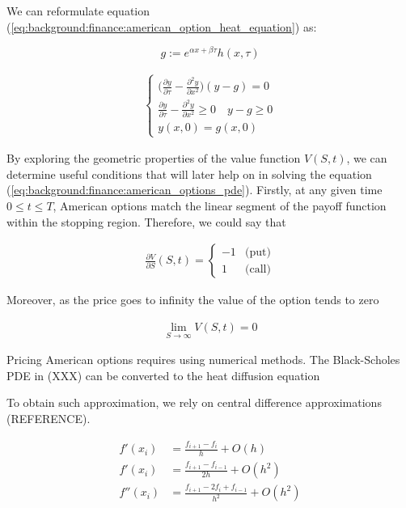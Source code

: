 We can reformulate equation (\ref*{eq:background:finance:american_option_heat_equation})
as:

\begin{equation}
  g := e^{\alpha x + \beta \tau}h(x, \tau)
\end{equation}

\begin{align}
  \begin{cases}
    \big(\frac{\partial y}{\partial \tau} - \frac{\partial^2 y}{\partial x^2}\big)(y  - g) =0 \\
    \frac{\partial y}{\partial \tau} - \frac{\partial^2 y}{\partial x^2} \ge 0 \quad y - g \ge 0 \\
    y(x, 0) = g(x, 0)
  \end{cases}
\end{align}


By exploring the geometric properties of the value function $V(S,t)$, 
we can determine useful conditions that will later help on in solving the equation 
(\ref*{eq:background:finance:american_options_pde}). Firstly, at
any given time $0 \le t \le T$, American options match the linear segment of the payoff
function within the stopping region. Therefore, we could say that 

\begin{align}
  \frac{\partial V}{\partial S}(S, t) =  \begin{cases}
    -1 & \text{(put)} \\ 
    1 & \text{(call)}
  \end{cases}
  \label{eq:background:finance:american_option_left_boundary}
\end{align}

Moreover, as the price goes to infinity the value of the option tends to zero

\begin{align}
  \lim_{S \rightarrow \infty}V(S, t) = 0 
  \label{eq:background:finance:american_option_stopping_right_boundary}
\end{align}



Pricing American options requires using numerical methods. The Black-Scholes PDE 
in (XXX) can be converted to the heat diffusion equation



To obtain such approximation, we rely on central difference approximations (REFERENCE).

\begin{align}
  f'(x_i) &= \frac{f_{i+1} - f_{i}}{h} + O(h) \\
  f'(x_i) &= \frac{f_{i+1} - f_{i-1}}{2h} + O(h^2) \\
  f''(x_i) &= \frac{f_{i+1} - 2f_{i} + f_{i-1}}{h^2} + O(h^2)
\end{align}


